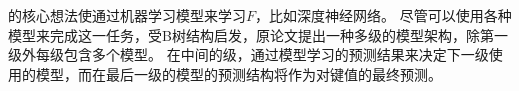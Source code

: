 {\rmi}的核心想法使通过机器学习模型来学习{\cdf}$F$，比如深度神经网络。
尽管可以使用各种模型来完成这一任务，受B树结构启发，原论文提出一种多级的模型架构，除第一级外每级包含多个模型。
在中间的级，通过模型学习的{\cdf}预测结果来决定下一级使用的模型，而在最后一级的模型的预测结构将作为对键{\cdf}值的最终预测。


